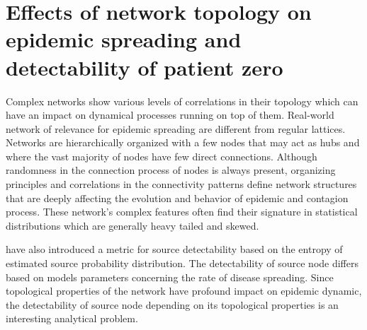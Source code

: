 \documentclass[times, utf8, diplomski]{fer}
\begin{document}
\section{Effects of network topology on epidemic spreading and detectability of patient zero}
Complex networks show various levels of correlations in their topology which can have an impact on dynamical processes running on top of them. 
Real-world network of relevance for epidemic spreading are different from regular lattices. Networks are hierarchically organized with a few nodes that may act as hubs and where the vast majority of nodes have few direct connections. Although randomness in the connection process of nodes is always present, organizing principles and correlations in the connectivity patterns define network structures that are deeply affecting the evolution and behavior of epidemic and contagion process. These network's complex features often find their signature in statistical distributions which are generally heavy tailed and skewed. 

\citet{Nino} have also introduced a metric for source detectability based on the entropy of estimated source probability distribution. The detectability of source node differs based on models parameters concerning the rate of disease spreading. Since topological properties of the network  have profound impact on epidemic dynamic, the detectability of source node depending on its topological properties is an interesting analytical problem.
\end{document}
